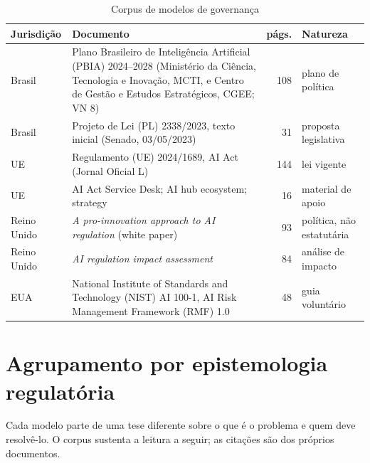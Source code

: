 \documentclass[12pt,a4paper,oneside,english,brazil]{abntex2}
\begin{document}
\begin{table}[htbp]
\caption{Corpus de modelos de governança}\label{tab:corpus}
\centering\small
\begin{tabularx}{\linewidth}{l L r l}
\toprule
Jurisdição & Documento & págs. & Natureza\\
\midrule
Brasil & Plano Brasileiro de Inteligência Artificial (PBIA) 2024--2028 (Ministério da Ciência, Tecnologia e Inovação, MCTI, e Centro de Gestão e Estudos Estratégicos, CGEE; VN 8) \cite{pbia2025} & 108 & plano de política\\
Brasil & Projeto de Lei (PL) 2338/2023, texto inicial (Senado, 03/05/2023) \cite{pl2338-2023} & 31 & proposta legislativa\\
UE & Regulamento (UE) 2024/1689, AI Act (Jornal Oficial L) \cite{aiact2024} & 144 & lei vigente\\
UE & AI Act Service Desk; AI hub ecosystem; strategy \cite{ec-aiact-sip,aiod,ec-ai-continent} & 16 & material de apoio\\
Reino Unido & \emph{A pro-innovation approach to AI regulation} (white paper) \cite{uk-proinnovation2023} & 93 & política, não estatutária\\
Reino Unido & \emph{AI regulation impact assessment} \cite{uk-impact2023} & 84 & análise de impacto\\
EUA & National Institute of Standards and Technology (NIST) AI 100-1, AI Risk Management Framework (RMF) 1.0 \cite{nist-ai-rmf2023} & 48 & guia voluntário\\
\bottomrule
\end{tabularx}
\end{table}

\section{Agrupamento por epistemologia regulatória}
Cada modelo parte de uma tese diferente sobre o que é o problema e quem deve resolvê-lo. O corpus sustenta a leitura a seguir; as citações são dos próprios documentos.
\end{document}
